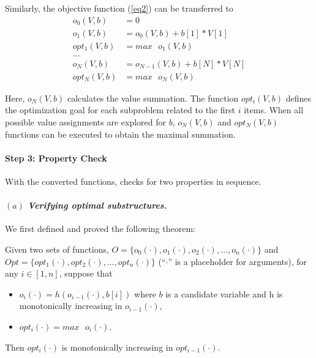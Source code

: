 Similarly, the objective function (\ref{eq2}) can be transferred to
\begin{align}
\label{fun2}
o_0(V, b)&=0 \nonumber\\
o_1(V, b)&=o_0(V, b) + b[1] * V[1]\nonumber\\
opt_1(V, b)&=max \text{ }o_1(V, b) \nonumber\\
\ldots \tag{3.4}\\
o_N(V, b)&=o_{N-1}(V, b) + b[N] * V[N]\nonumber\\
opt_N(V, b)&=max\text{ }o_N(V, b) \nonumber
\end{align}

Here, $o_N(V, b)$ calculates the value summation.
The function $opt_i(V, b)$ defines the optimization goal for each subproblem related to the first $i$ items. When all possible value assignments are explored for $b$, $o_N(V, b)$ and $opt_N(V, b)$ functions can be executed to obtain the maximal summation. 




\paragraph{Step 3: Property Check}
With the converted functions, \tool checks for two properties in sequence. 

\paragraph{$(a)$ \emph{Verifying optimal substructures.}}
We first defined and proved the following theorem:

\begin{theorem}
\label{thm1}
Given two sets of functions, $O=\{o_0(\cdot), o_1(\cdot), o_2(\cdot),  \ldots, o_n(\cdot)\}$ and  $Opt=\{opt_1(\cdot), opt_2(\cdot), \ldots, opt_n(\cdot)\}$ (``$\cdot$'' is a placeholder for arguments), for any $i\in[1, n]$, suppose that
\begin{itemize}
    \item $o_i(\cdot)=h(o_{i-1}(\cdot), b[i])$ where $b$ is a candidate variable and h is monotonically increasing in $o_{i-1}(\cdot)$,  
    \item $opt_i(\cdot)=max\text{ }o_i(\cdot)$. 
\end{itemize}
Then $opt_i(\cdot)$ is monotonically increasing in $opt_{i-1}(\cdot)$. 
\end{theorem}

